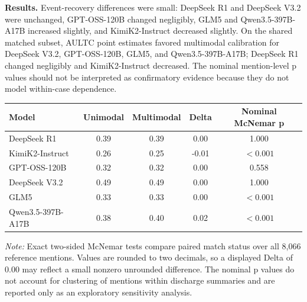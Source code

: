 \vspace{2mm}\noindent
\textbf{Results.} Event-recovery differences were small: DeepSeek R1 and DeepSeek V3.2 were unchanged, GPT-OSS-120B changed negligibly, GLM5 and Qwen3.5-397B-A17B increased slightly, and KimiK2-Instruct decreased slightly. On the shared matched subset, AULTC point estimates favored multimodal calibration for DeepSeek V3.2, GPT-OSS-120B, GLM5, and Qwen3.5-397B-A17B; DeepSeek R1 changed negligibly and KimiK2-Instruct decreased. The nominal mention-level p values should not be interpreted as confirmatory evidence because they do not model within-case dependence.

\par\medskip
\noindent\begin{minipage}{\textwidth}
\small
{}
\centering
\begin{tabular}{@{}lcccc@{}}
\toprule
\textbf{Model} & \textbf{Unimodal} & \textbf{Multimodal} & \textbf{Delta} & \textbf{Nominal McNemar p} \\
\midrule
DeepSeek R1 & 0.39 & 0.39 & 0.00 & 1.000 \\
KimiK2-Instruct & 0.26 & 0.25 & -0.01 & $<0.001$ \\
GPT-OSS-120B & 0.32 & 0.32 & 0.00 & 0.558 \\
DeepSeek V3.2 & 0.49 & 0.49 & 0.00 & 1.000 \\
GLM5 & 0.33 & 0.33 & 0.00 & $<0.001$ \\
Qwen3.5-397B-A17B & 0.38 & 0.40 & 0.02 & $<0.001$ \\
\bottomrule
\end{tabular}
\par\vspace{0.3em}
\begin{minipage}{\textwidth}
\footnotesize\textit{Note:} Exact two-sided McNemar tests compare paired match status over all 8,066 reference mentions. Values are rounded to two decimals, so a displayed Delta of 0.00 may reflect a small nonzero unrounded difference. The nominal p values do not account for clustering of mentions within discharge summaries and are reported only as an exploratory sensitivity analysis.
\end{minipage}
\end{minipage}\par\medskip

